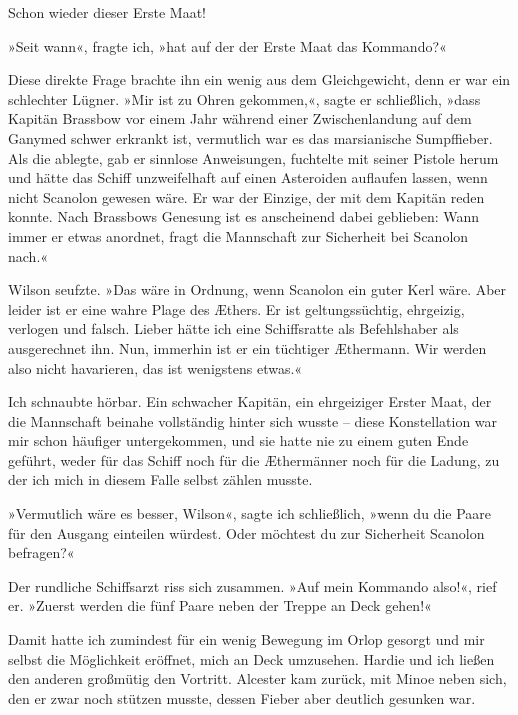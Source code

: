 \bigpar

Schon wieder dieser Erste Maat!

\bigpar

»Seit wann«, fragte ich, »hat auf der  der Erste
Maat das Kommando?«

Diese direkte Frage brachte ihn ein wenig aus dem Gleichgewicht,
denn er war ein schlechter Lügner. »Mir ist zu Ohren gekommen,«,
sagte er schließlich, »dass Kapitän Brassbow vor einem Jahr während
einer Zwischenlandung auf dem Ganymed schwer erkrankt ist,
vermutlich war es das marsianische Sumpffieber. Als die
 ablegte, gab er sinnlose Anweisungen, fuchtelte
mit seiner Pistole herum und hätte das Schiff unzweifelhaft auf
einen Asteroiden auflaufen lassen, wenn nicht Scanolon gewesen
wäre. Er war der Einzige, der mit dem Kapitän reden konnte. Nach
Brassbows Genesung ist es anscheinend dabei geblieben: Wann immer
er etwas anordnet, fragt die Mannschaft zur Sicherheit bei Scanolon
nach.«

Wilson seufzte. »Das wäre in Ordnung, wenn Scanolon ein guter Kerl
wäre. Aber leider ist er eine wahre Plage des Æthers. Er ist
geltungssüchtig, ehrgeizig, verlogen und falsch. Lieber hätte ich
eine Schiffsratte als Befehlshaber als ausgerechnet ihn. Nun,
immerhin ist er ein tüchtiger Æthermann. Wir werden also nicht
havarieren, das ist wenigstens etwas.«

Ich schnaubte hörbar. Ein schwacher Kapitän, ein ehrgeiziger Erster
Maat, der die Mannschaft beinahe vollständig hinter sich wusste –
diese Konstellation war mir schon häufiger untergekommen, und sie
hatte nie zu einem guten Ende geführt, weder für das Schiff noch
für die Æthermänner noch für die Ladung, zu der ich mich in diesem
Falle selbst zählen musste.

\bigpar

»Vermutlich wäre es besser, Wilson«, sagte ich schließlich, »wenn
du die Paare für den Ausgang einteilen würdest. Oder möchtest du
zur Sicherheit Scanolon befragen?«

Der rundliche Schiffsarzt riss sich zusammen. »Auf mein Kommando
also!«, rief er. »Zuerst werden die fünf Paare neben der Treppe an
Deck gehen!«

Damit hatte ich zumindest für ein wenig Bewegung im Orlop gesorgt
und mir selbst die Möglichkeit eröffnet, mich an Deck umzusehen.
Hardie und ich ließen den anderen großmütig den Vortritt. Alcester
kam zurück, mit Minoe neben sich, den er zwar noch stützen musste,
dessen Fieber aber deutlich gesunken war.

